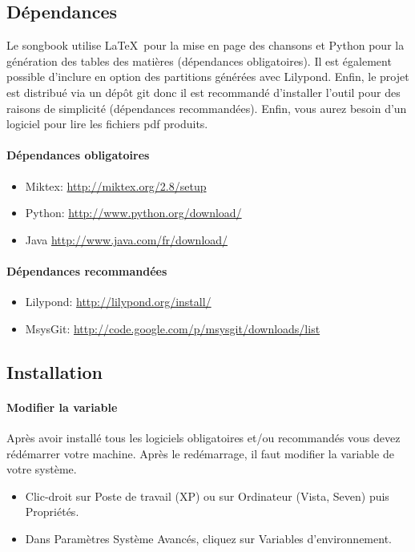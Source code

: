 \documentclass[versionenligne]{patacrep}
\begin{document}
\subsection{Dépendances}
\label{sec:songbook-dep-win}

Le songbook utilise \LaTeX\, pour la mise en page des chansons et
Python pour la génération des tables des matières (dépendances
obligatoires).  Il est également possible d'inclure en option des
partitions générées avec Lilypond. Enfin, le projet est distribué via
un dépôt git donc il est recommandé d'installer l'outil pour des
raisons de simplicité (dépendances recommandées). Enfin, vous aurez
besoin d'un logiciel pour lire les fichiers pdf produits.

\paragraph{Dépendances obligatoires}
\begin{itemize}
\item Miktex: \url{http://miktex.org/2.8/setup}
\item Python: \url{http://www.python.org/download/}
\item Java \url{http://www.java.com/fr/download/}
\end{itemize}

\paragraph{Dépendances recommandées}
\begin{itemize} 
\item Lilypond: \url{http://lilypond.org/install/}
\item MsysGit: \url{http://code.google.com/p/msysgit/downloads/list}
\end{itemize}

\subsection{Installation}
\label{sec:install-win}

\paragraph{Modifier la variable }
Après avoir installé tous les logiciels obligatoires et/ou recommandés
vous devez rédémarrer votre machine.  Après le redémarrage, il faut
modifier la variable  de votre système.
\begin{itemize}
\item Clic-droit sur Poste de travail (XP) ou sur Ordinateur (Vista,
  Seven) puis Propriétés.
\item Dans Paramètres Système Avancés, cliquez sur Variables
  d'environnement.
\end{itemize}
\end{document}
